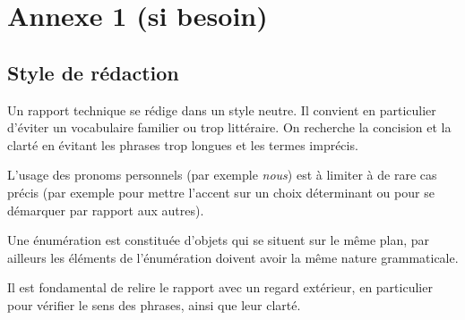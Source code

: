 \chapter*{Annexe 1 (si besoin)}

\makeatletter
\renewcommand{\thesection}{\@arabic\c@section}
\makeatother

\setcounter{section}{0}

\section*{Style de rédaction}
Un rapport technique se rédige dans un style neutre. Il convient en particulier d’éviter un vocabulaire familier ou trop littéraire. On recherche la concision et la clarté en évitant les phrases trop longues et les termes imprécis.

L’usage des pronoms personnels (par exemple \textit{nous}) est à limiter à de rare cas précis (par exemple pour mettre l’accent sur un choix déterminant ou pour se démarquer par rapport aux autres).

Une énumération est constituée d’objets qui se situent sur le même plan, par ailleurs les éléments de l’énumération doivent avoir la même nature grammaticale.

Il est fondamental de relire le rapport avec un regard extérieur, en particulier pour vérifier le sens des phrases, ainsi que leur clarté.
